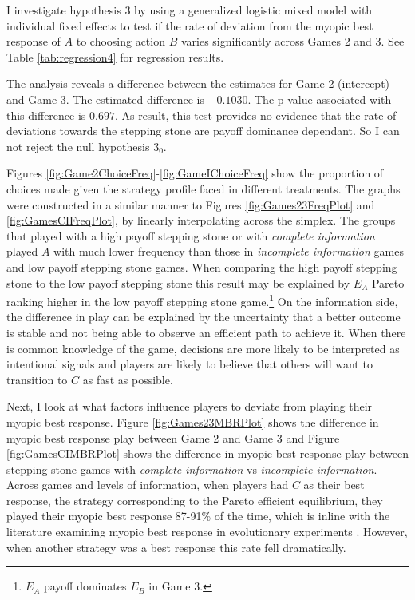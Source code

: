 I investigate hypothesis 3 by using a generalized logistic mixed model with individual fixed effects to test if the rate of deviation from the myopic best response of $A$ to choosing action $B$ varies significantly across Games 2 and 3. See Table \ref{tab:regression4} for regression results. 

The analysis reveals a difference between the estimates for Game 2 (intercept) and Game 3. The estimated difference is $-0.1030$. The p-value associated with this difference is $0.697$. As result, this test provides no evidence that the rate of deviations towards the stepping stone are payoff dominance dependant. So I can not reject the null hypothesis $3_0$.

Figures \ref{fig:Game2ChoiceFreq}-\ref{fig:GameIChoiceFreq} show the proportion of choices made given the strategy profile faced in different treatments. The graphs were constructed in a similar manner to Figures \ref{fig:Games23FreqPlot} and \ref{fig:GamesCIFreqPlot}, by linearly interpolating across the simplex. The groups that played with a high payoff stepping stone or with \textit{complete information} played $A$ with much lower frequency than those in \textit{incomplete information} games and low payoff stepping stone games. When comparing the high payoff stepping stone to the low payoff stepping stone this result may be explained by $E_A$ Pareto ranking higher in the low payoff stepping stone game.\footnote{$E_A$ payoff dominates $E_B$ in Game 3.} On the information side, the difference in play can be explained by the uncertainty that a better outcome is stable and not being able to observe an efficient path to achieve it. When there is common knowledge of the game, decisions are more likely to be interpreted as intentional signals and players are likely to believe that others will want to transition to $C$ as fast as possible.

Next, I look at what factors influence players to deviate from playing their myopic best response. Figure \ref{fig:Games23MBRPlot} shows the difference in myopic best response play between Game 2 and Game 3 and Figure \ref{fig:GamesCIMBRPlot} shows the difference in myopic best response play between stepping stone games with \textit{complete information} vs \textit{incomplete information}. Across games and levels of information, when players had $C$ as their best response, the strategy corresponding to the Pareto efficient equilibrium, they played their myopic best response 87-91\% of the time, which is inline with the literature examining myopic best response in evolutionary experiments \citep{hwang2018conventional, mas2016behavioral, lim2016experimental}. However, when another strategy was a best response this rate fell dramatically. 

